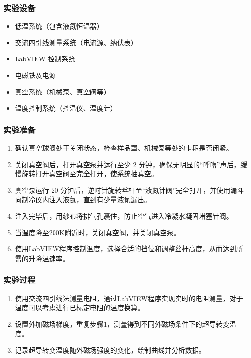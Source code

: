 \subsubsection{实验设备}
\begin{itemize}
    \item 低温系统（包含液氮恒温器）
    \item 交流四引线测量系统（电流源、纳伏表）
    \item LabVIEW 控制系统
    \item 电磁铁及电源
    \item 真空系统（机械泵、真空阀等）
    \item 温度控制系统（控温仪、温度计）
\end{itemize}

\subsubsection{实验准备}
\begin{enumerate}
    \item 确认真空球阀处于关闭状态，检查样品罩、机械泵等处的卡箍是否闭紧。
    \item 关闭真空阀后，打开真空泵并运行至少 2 分钟，确保无明显的“呼噜”声后，缓慢旋转打开真空阀至完全打开，使系统抽真空。
    \item 真空泵运行 20 分钟后，逆时针旋转丝杆至“液氮针阀”完全打开，并使用漏斗向制冷仪内注入液氮，直到有少量液氮漏出。
    \item 注入完毕后，用纱布将排气孔裹住，防止空气进入冷凝水凝固堵塞针阀。
    \item 当温度降至200K附近时，关闭真空阀，并关闭真空泵。
    \item 使用LabVIEW程序控制温度，选择合适的挡位和调整丝杆高度，从而达到所需的升降温速率。
\end{enumerate}

\subsubsection{实验过程}
\begin{enumerate}
    \item 使用交流四引线法测量电阻，通过LabVIEW程序实现实时的电阻测量，对于温度可以考虑进行已标定电阻的温度换算。
    \item 设置外加磁场梯度，重复步骤1，测量得到不同外磁场条件下的超导转变温度。
    \item 记录超导转变温度随外磁场强度的变化，绘制曲线并分析数据。
\end{enumerate}

